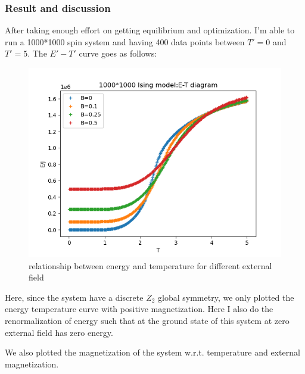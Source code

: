 \documentclass[11pt]{article}
\begin{document}
\subsubsection{Result and discussion}

After taking enough effort on getting equilibrium and optimization. I'm able to run a 1000*1000 spin system and having 400 data points between $T' = 0$ and $T' = 5$. The $E'-T'$ curve goes as follows:

\begin{figure}[H]
    \centering
    \includegraphics[scale = 0.7]{Figs_XYL/E-T_withB_diagram(latest).png}
    \caption{relationship between energy and temperature for different external field}
    \label{ETXinyu}
\end{figure}

Here, since the system have a discrete $Z_2$ global symmetry, we only plotted the energy temperature curve with positive magnetization. Here I also do the renormalization of energy such that at the ground state of this system at zero external field has zero energy.

We also plotted the magnetization of the system w.r.t. temperature and external magnetization.
\end{document}

